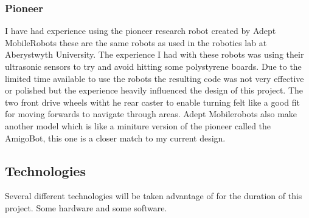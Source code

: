 \documentclass[11pt,fleqn,twoside]{article}
\begin{document}
\subsubsection{Pioneer}
I have had experience using the pioneer research robot created by Adept MobileRobots \cite{mobilerobots} these are the same robots as used in the robotics lab at Aberystwyth University.  The experience I had with these robots was using their ultrasonic sensors to try and avoid hitting some polystyrene boards.  Due to the limited time available to use the robots the resulting code was not very effective or polished but the experience heavily influenced the design of this project.  The two front drive wheels witht he rear caster to enable turning felt like a good fit for moving forwards to navigate through areas.  Adept Mobilerobots also make another model which is like a miniture version of the pioneer called the AmigoBot, this one is a closer match to my current design.
\subsection{Technologies}
Several different technologies will be taken advantage of for the duration of this project.  Some hardware and some software.
\end{document}
